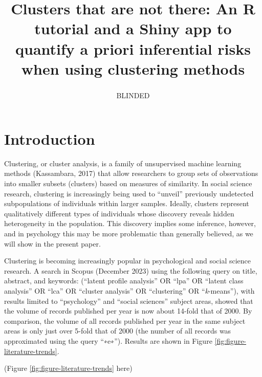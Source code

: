 \documentclass[
  man,floatsintext]{apa7}
\title{\textbf{Clusters that are not there: An R tutorial and a Shiny app to quantify a priori inferential risks when using clustering methods}}
\author{BLINDED\textsuperscript{}}
\date{}
\affiliation{\phantom{0}}
\begin{document}
\maketitle

\hypertarget{introduction}{%
\section{Introduction}\label{introduction}}

Clustering, or cluster analysis, is a family of unsupervised machine learning methods (Kassambara, 2017) that allow researchers to group sets of observations into smaller subsets (clusters) based on measures of similarity. In social science research, clustering is increasingly being used to ``unveil'' previously undetected subpopulations of individuals within larger samples. Ideally, clusters represent qualitatively different types of individuals whose discovery reveals hidden heterogeneity in the population. This discovery implies some inference, however, and in psychology this may be more problematic than generally believed, as we will show in the present paper.

Clustering is becoming increasingly popular in psychological and social science research. A search in Scopus (December 2023) using the following query on title, abstract, and keywords: (``latent profile analysis'' OR ``lpa'' OR ``latent class analysis'' OR ``lca'' OR ``cluster analysis'' OR ``clustering'' OR ``\emph{k}-means''), with results limited to ``psychology'' and ``social sciences'' subject areas, showed that the volume of records published per year is now about 14-fold that of 2000. By comparison, the volume of all records published per year in the same subject areas is only just over 5-fold that of 2000 (the number of all records was approximated using the query ``∗e∗''). Results are shown in Figure \ref{fig:figure-literature-trends}.

(Figure \ref{fig:figure-literature-trends} here)
\end{document}
